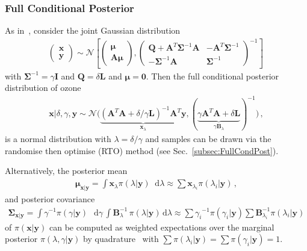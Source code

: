 \documentclass{article}
\newcommand{\diff}{\mathop{}\!\mathrm{d}}
\begin{document}
\subsubsection{Full Conditional Posterior}
\label{subsec:firstCond}
As in~\cite{SIMPSON201216}, consider the joint Gaussian distribution
\begin{align}
	\begin{pmatrix}
		\bm{x} \\
		\bm{y}
	\end{pmatrix}\sim \mathcal{N}\left[  \begin{pmatrix}
		\bm{\mu} \\
		\bm{A}\bm{\mu}
	\end{pmatrix},\begin{pmatrix}
		\bm{Q} + \bm{A}^T \bm{\Sigma}^{-1} \bm{A} & - \bm{A}^T \bm{\Sigma}^{-1} \\
		-\bm{\Sigma}^{-1} \bm{A} & \bm{\Sigma}^{-1} 
	\end{pmatrix}^{-1} \right] \, 	\label{eq:jointMultiGaus}
\end{align}
with $\bm{\Sigma}^{-1} = \gamma \bm{I} $ and $\bm{Q}  = \delta \bm{L} $ and $\bm{\mu} = \bm{0}$.
Then the full conditional posterior distribution of ozone 
\begin{align}
	\bm{x}| \delta, \gamma, \bm{y}  \sim \mathcal{N}\big( \underbrace{ (\bm{A}^T \bm{A} + \delta / \gamma \bm{L} )^{-1} \bm{A}^T \bm{y}}_{\bm{x}_{\lambda}}, ( \underbrace{ \gamma \bm{A}^T \bm{A} + \delta \bm{L} }_{\gamma \bm{B}_{\lambda}}  )^{-1} \big) \, \label{eq:CondPost},
\end{align}
is a normal distribution with $\lambda = \delta / \gamma $ and samples can be drawn via the randomise then optimise (RTO) method (see Sec.~\ref{subsec:FullCondPost}).

Alternatively, the posterior mean
\begin{align}
	\bm{\mu}_{\bm{x}|\bm{y}} = \int \bm{x}_{\lambda} \pi(\lambda| \bm{y}) \diff\lambda \approx \sum \bm{x}_{\lambda_i} \pi(\lambda_i| \bm{y}) \, , \label{eq:MeanInt}
\end{align} and posterior covariance
\begin{align}
	\bm{\Sigma}_{\bm{x}|\bm{y}} = \int \gamma^{-1}  \pi(\gamma | \bm{y} ) \, \diff \gamma \, \int  \bm{B}_{\lambda}^{-1} \, \pi(\lambda | \bm{y} )  \, \text{d} \lambda  \approx \sum {\gamma_i}^{-1}\pi(\gamma_i| \bm{y}) \sum \bm{B}_{\lambda_i}^{-1}\pi(\lambda_i| \bm{y})\, \label{eq:CovInt}
\end{align}
of $\pi(\bm{x}| \bm{y})$ can be computed as weighted expectations over the marginal posterior $\pi(\lambda,\gamma | \bm{y})$ by quadrature~\cite[Sec. 2.1]{Dick_Kuo_Sloan_2013} with $\sum \pi(\lambda_i| \bm{y}) = \sum \pi(\gamma_i| \bm{y}) = 1$.
\end{document}
